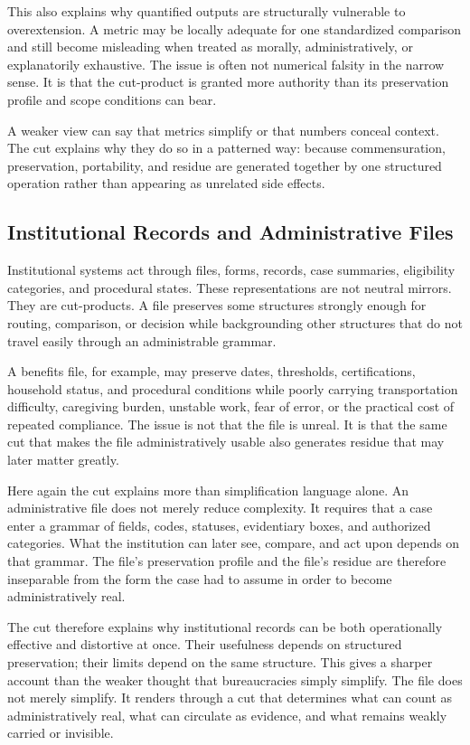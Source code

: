 \documentclass[11pt]{article}
\begin{document}
This also explains why quantified outputs are structurally vulnerable to overextension. A metric may be locally adequate for one standardized comparison and still become misleading when treated as morally, administratively, or explanatorily exhaustive. The issue is often not numerical falsity in the narrow sense. It is that the cut-product is granted more authority than its preservation profile and scope conditions can bear.

A weaker view can say that metrics simplify or that numbers conceal context. The cut explains why they do so in a patterned way: because commensuration, preservation, portability, and residue are generated together by one structured operation rather than appearing as unrelated side effects.

\subsection{Institutional Records and Administrative Files}

Institutional systems act through files, forms, records, case summaries, eligibility categories, and procedural states. These representations are not neutral mirrors. They are cut-products. A file preserves some structures strongly enough for routing, comparison, or decision while backgrounding other structures that do not travel easily through an administrable grammar. \cite{bowker_star_sorting_things_out,scott_seeing_like_a_state,herd_moynihan_administrative_burden}

A benefits file, for example, may preserve dates, thresholds, certifications, household status, and procedural conditions while poorly carrying transportation difficulty, caregiving burden, unstable work, fear of error, or the practical cost of repeated compliance. The issue is not that the file is unreal. It is that the same cut that makes the file administratively usable also generates residue that may later matter greatly.

Here again the cut explains more than simplification language alone. An administrative file does not merely reduce complexity. It requires that a case enter a grammar of fields, codes, statuses, evidentiary boxes, and authorized categories. What the institution can later see, compare, and act upon depends on that grammar. The file's preservation profile and the file's residue are therefore inseparable from the form the case had to assume in order to become administratively real.

The cut therefore explains why institutional records can be both operationally effective and distortive at once. Their usefulness depends on structured preservation; their limits depend on the same structure. This gives a sharper account than the weaker thought that bureaucracies simply simplify. The file does not merely simplify. It renders through a cut that determines what can count as administratively real, what can circulate as evidence, and what remains weakly carried or invisible.
\end{document}
